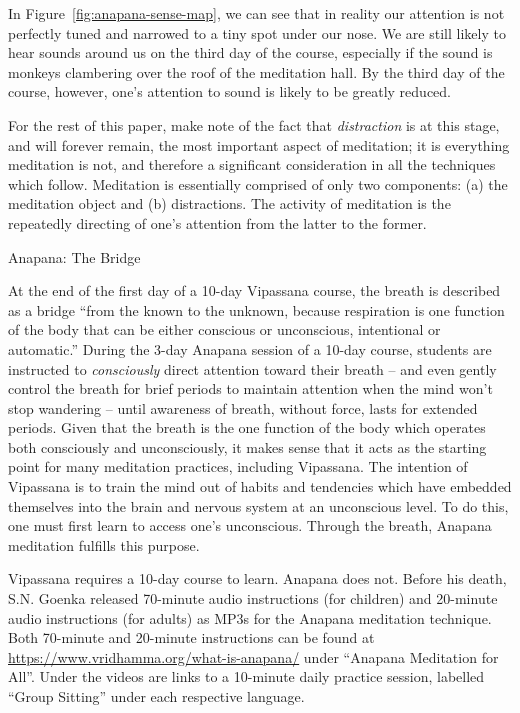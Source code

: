 \documentclass{article}
\begin{document}
In Figure~\ref{fig:anapana-sense-map}, we can see that in reality our attention is not perfectly tuned and narrowed to a tiny spot under our nose. We are still likely to hear sounds around us on the third day of the course, especially if the sound is monkeys clambering over the roof of the meditation hall. By the third day of the course, however, one's attention to sound is likely to be greatly reduced.

For the rest of this paper, make note of the fact that \textit{distraction} is at this stage, and will forever remain, the most important aspect of meditation; it is everything meditation is not, and therefore a significant consideration in all the techniques which follow. Meditation is essentially comprised of only two components: (a) the meditation object and (b) distractions. The activity of meditation is the repeatedly directing of one's attention from the latter to the former.

\pagebreak

\begin{center}
  \LARGE{Anapana: The Bridge}
\end{center}

At the end of the first day of a 10-day Vipassana course, the breath is described as a bridge ``from the known to the unknown, because respiration is one function of the body that can be either conscious or unconscious, intentional or automatic.'' During the 3-day Anapana session of a 10-day course, students are instructed to \textit{consciously} direct attention toward their breath -- and even gently control the breath for brief periods to maintain attention when the mind won't stop wandering -- until awareness of breath, without force, lasts for extended periods. Given that the breath is the one function of the body which operates both consciously and unconsciously, it makes sense that it acts as the starting point for many meditation practices, including Vipassana. The intention of Vipassana is to train the mind out of habits and tendencies which have embedded themselves into the brain and nervous system at an unconscious level. To do this, one must first learn to access one's unconscious. Through the breath, Anapana meditation fulfills this purpose.

Vipassana requires a 10-day course to learn. Anapana does not. Before his death,
S.N. Goenka released 70-minute audio instructions (for children) and 20-minute audio
instructions (for adults) as MP3s for the Anapana meditation technique.\cite{anapana}
Both 70-minute and 20-minute instructions can be found at
\url{https://www.vridhamma.org/what-is-anapana/} under ``Anapana Meditation for
All''. Under the videos are links to a 10-minute daily practice session, labelled
``Group Sitting'' under each respective language.
\end{document}
